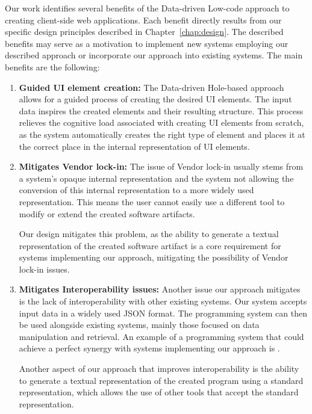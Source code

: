 Our work identifies several benefits of the Data-driven Low-code approach to creating client-side web applications.
Each benefit directly results from our specific design principles described in Chapter~\ref{chap:design}.
The described benefits may serve as a motivation to implement new systems employing our described approach or incorporate our approach into existing systems.
The main benefits are the following:
\begin{enumerate}
	\item \textbf{Guided UI element creation:} The Data-driven Hole-based approach allows for a guided process of creating the desired UI elements.
	      The input data inspires the created elements and their resulting structure.
	      This process relieves the cognitive load associated with creating UI elements from scratch, as the system automatically creates the right type
	      of element and places it at the correct place in the internal representation of UI elements.

	\item \textbf{Mitigates Vendor lock-in:} The issue of Vendor lock-in usually stems from a system's opaque internal representation
	      and the system not allowing the conversion of this internal representation to a more widely used representation.
	      This means the user cannot easily use a different tool to modify or extend the created software artifacts.

	      Our design mitigates this problem, as the ability to generate a textual representation of the created software artifact is a core requirement
	      for systems implementing our approach, mitigating the possibility of Vendor lock-in issues.

	\item \textbf{Mitigates Interoperability issues:}
	      Another issue our approach mitigates is the lack of interoperability with other existing systems.
	      Our system accepts input data in a widely used JSON format.
	      The programming system can then be used alongside existing systems, mainly those focused on data manipulation and retrieval.
	      An example of a programming system that could achieve a perfect synergy with systems implementing our approach is \citet{graphql}.

	      Another aspect of our approach that improves interoperability is the ability to generate a textual representation of the created program using a standard representation, which allows the use of other tools that accept the standard representation.
\end{enumerate}


